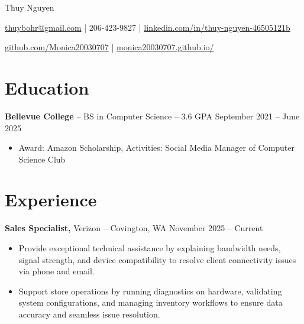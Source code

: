 \documentclass[11pt]{article}       %
\begin{document}
\centerline{\Huge Thuy Nguyen}

\vspace{5pt}

\centerline{\href{mailto:thuybohr@gmail.com}{thuybohr@gmail.com} | 206-423-9827 |
\href{https://www.linkedin.com/in/thuy-nguyen-46505121b/}{linkedin.com/in/thuy-nguyen-46505121b}}

\centerline{\href{https://github.com/Monica20030707}{github.com/Monica20030707} | 
\href{https://monica20030707.github.io/}{monica20030707.github.io/}} 

\vspace{-9pt}

\section*{Education}
\textbf{Bellevue College} -- BS in Computer Science -- 3.6 GPA \hfill September 2021 -- June 2025\\
\vspace{-9pt}
\begin{itemize}
  \item Award: Amazon Scholarship, Activities: Social Media Manager of Computer Science Club
\end{itemize}

\vspace{-18.5pt}

\section*{Experience}

\textbf{Sales Specialist,} {Verizon} -- Covington, WA \hfill November 2025 -- Current \\
\vspace{-9pt}
\begin{itemize}
  \item Provide exceptional technical assistance by explaining bandwidth needs, signal strength, and device compatibility to resolve client connectivity issues via phone and email.
  \item Support store operations by running diagnostics on hardware, validating system configurations, and managing inventory workflows to ensure data accuracy and seamless issue resolution.
\end{itemize}
\end{document}
